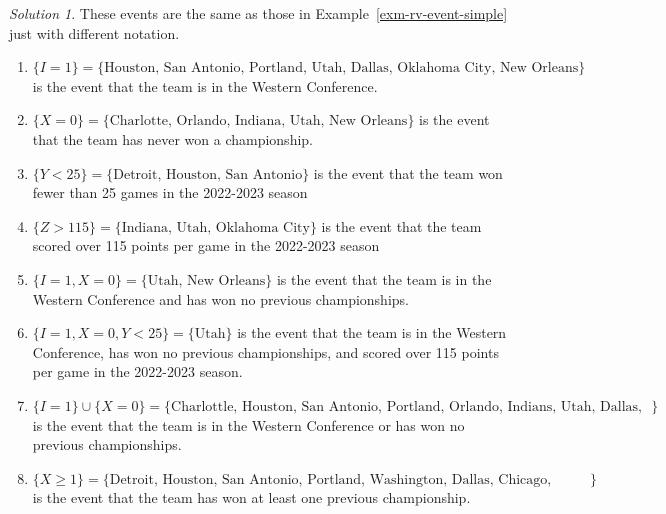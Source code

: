 \documentclass[
  letterpaper,
  DIV=11,
  numbers=noendperiod]{scrreprt}
\providecommand{\tightlist}{%
  \setlength{\itemsep}{0pt}\setlength{\parskip}{0pt}}
\theoremstyle{plain}
\theoremstyle{definition}
\theoremstyle{definition}
\theoremstyle{definition}
\theoremstyle{remark}
\newtheorem{refsolution}{Solution}[chapter]
\begin{document}
\begin{tcolorbox}[enhanced jigsaw, opacityback=0, rightrule=.15mm, coltitle=black, colframe=quarto-callout-tip-color-frame, toprule=.15mm, colbacktitle=quarto-callout-tip-color!10!white, opacitybacktitle=0.6, left=2mm, toptitle=1mm, breakable, title={Solution (click to expand)}, bottomtitle=1mm, colback=white, leftrule=.75mm, titlerule=0mm, arc=.35mm, bottomrule=.15mm]

\begin{refsolution}
These events are the same as those in Example~\ref{exm-rv-event-simple}
just with different notation.

\begin{enumerate}
\def\labelenumi{\arabic{enumi}.}
\tightlist
\item
  \(\{I = 1\} = \{\text{Houston, San Antonio, Portland, Utah, Dallas, Oklahoma City, New Orleans}\}\)
  is the event that the team is in the Western Conference.
\item
  \(\{X = 0\} = \{\text{Charlotte, Orlando, Indiana, Utah, New Orleans}\}\)
  is the event that the team has never won a championship.
\item
  \(\{Y < 25\} = \{\text{Detroit, Houston, San Antonio}\}\) is the event
  that the team won fewer than 25 games in the 2022-2023 season
\item
  \(\{Z > 115\} = \{\text{Indiana, Utah, Oklahoma City}\}\) is the event
  that the team scored over 115 points per game in the 2022-2023 season
\item
  \(\{I = 1, X = 0\} = \{\text{Utah, New Orleans}\}\) is the event that
  the team is in the Western Conference and has won no previous
  championships.
\item
  \(\{I = 1, X = 0, Y < 25\}=\{\text{Utah}\}\) is the event that the
  team is in the Western Conference, has won no previous championships,
  and scored over 115 points per game in the 2022-2023 season.
\item
  \(\{I = 1\}\cup \{X = 0\}=\{\text{Charlottle, Houston, San Antonio, Portland, Orlando, Indians, Utah, Dallas, Oklahoma City, New Orleans}\}\)
  is the event that the team is in the Western Conference or has won no
  previous championships.
\item
  \(\{X \ge 1\}=\{\text{Detroit, Houston, San Antonio, Portland, Washington, Dallas, Chicago, Oklahoma City, Toronto}\}\)
  is the event that the team has won at least one previous championship.
\end{enumerate}

\label{sol-rv-event-simple}

\end{refsolution}

\end{tcolorbox}
\end{document}
